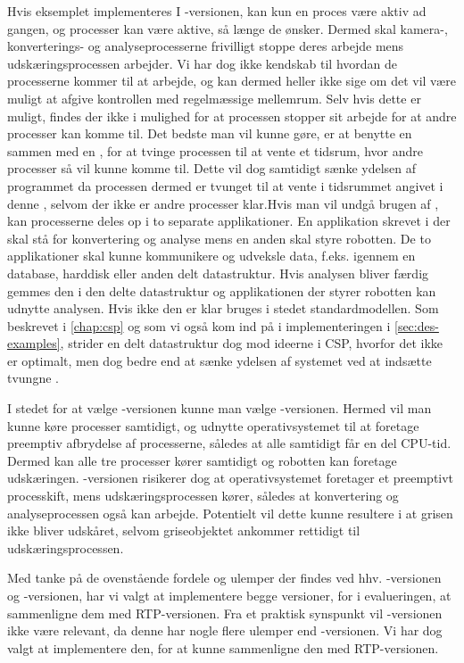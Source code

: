 Hvis eksemplet implementeres I -versionen, kan kun  en proces være aktiv ad gangen, og processer kan være aktive, så længe de ønsker. Dermed skal kamera-, konverterings- og analyseprocesserne frivilligt stoppe deres arbejde mens  udskæringsprocessen arbejder.  Vi har dog ikke kendskab til hvordan de  processerne kommer til at arbejde, og kan dermed heller ikke sige om det vil være muligt at afgive kontrollen med regelmæssige mellemrum. Selv hvis dette er muligt, findes der ikke i \pycsp mulighed for at processen stopper sit arbejde for at andre  processer kan komme til. Det bedste man vil kunne gøre, er at benytte en   sammen med en , for at tvinge processen til at vente et tidsrum, hvor andre processer så vil kunne komme til. Dette vil dog samtidigt sænke ydelsen af programmet da processen dermed er tvunget til at vente i tidsrummet angivet i denne , selvom der ikke er andre processer klar.Hvis man vil undgå brugen af , kan processerne deles op i to separate applikationer. En applikation skrevet i \pycsp der skal stå for konvertering og analyse mens en anden skal styre robotten. De to applikationer skal kunne kommunikere og  udveksle data, f.eks. igennem en database, harddisk eller anden delt datastruktur. Hvis analysen bliver færdig gemmes den i den delte datastruktur og applikationen der styrer robotten kan udnytte analysen. Hvis ikke den er klar bruges i stedet standardmodellen. Som beskrevet i \autoref{chap:csp} og som vi også kom ind på i implementeringen i \autoref{sec:des-examples}, strider en delt datastruktur dog mod ideerne i CSP, hvorfor det ikke er optimalt, men dog bedre end at sænke ydelsen af systemet ved at indsætte tvungne .

I stedet for at vælge -versionen kunne man vælge -versionen. Hermed vil man kunne køre processer samtidigt, og udnytte operativsystemet til at foretage preemptiv afbrydelse af processerne, således at alle samtidigt får en del CPU-tid. Dermed kan alle tre processer kører samtidigt og robotten kan foretage udskæringen. -versionen risikerer dog at operativsystemet foretager et preemptivt processkift, mens udskæringsprocessen kører, således at konvertering og  analyseprocessen også kan arbejde. Potentielt vil dette kunne resultere i at grisen ikke bliver udskåret, selvom griseobjektet ankommer rettidigt til udskæringsprocessen.

Med tanke på de ovenstående fordele og ulemper der findes ved hhv.  -versionen og -versionen,  har vi valgt at implementere begge versioner, for i evalueringen, at sammenligne dem med RTP-versionen. Fra et praktisk synspunkt vil -versionen ikke være relevant, da denne har nogle flere ulemper end -versionen. Vi har dog valgt at implementere den, for at kunne sammenligne den med RTP-versionen. 

